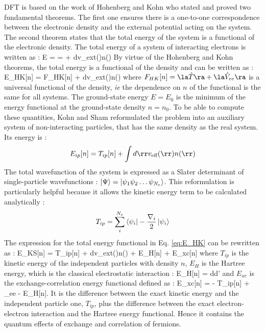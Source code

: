 \acrshort{DFT} is based on the work of Hohenberg and Kohn who stated and proved two fundamental theorems. \cite{hohenberg1964} The first one ensures there is a one-to-one correspondence between the electronic density and the external potential acting on the system. The second theorem states that the total energy of the system is a functional of the electronic density.
The total energy of a system of interacting electrons is written as :
\be
	E =  =  + \int d\rr v_{ext}(\rr)n(\rr)
\ee
By virtue of the Hohenberg and Kohn theorems, the total energy is a functional of the density and can be written as :
\be
 	E_{HK}[n] = F_{HK}[n] + \int d\rr v_{ext}(\rr)n(\rr)
	\label{eq:E_HK}
\ee
where $F_{HK}[n] = \la \hat{T} \ra + \la \hat{V}_{ee} \ra$ is a universal functional of the density, \emph{ie} the dependence on $n$ of the functional is the same for all systems. The ground-state energy $E = E_0$ is the minimum of the energy functional at the ground-state density $n=n_0$. To be able to compute these quantities, Kohn and Sham reformulated the problem into an auxiliary system of non-interacting particles, that has the same density as the real system.\cite{kohn1965} Its energy is :
\begin{equation}
	E_{ip}[n] = T_{ip}[n] + \int d\rr v_{\text{eff}}(\rr)n(\rr)
\end{equation}	
The total wavefunction of the system is expressed as a Slater determinant of single-particle wavefunctions : $\ket{\Psi} =\ket{\psi_1\psi_2 \ldots \psi_{N_e}}$. This reformulation is particularly helpful because it allows the kinetic energy term to be calculated analytically :
\begin{equation}
	T_{ip} =  \sum_i^{N_e} \bra{\psi_i}-\frac{\nabla_i}{2} \ket{\psi_i}
\end{equation}
The expression for the total energy functional in Eq. \eqref{eq:E_HK} can be rewritten as :
\be
	E_{KS}[n] = T_{ip}[n] + \int d\rr v_{ext}(\rr)n(\rr) + E_H[n] + E_{xc}[n]
\ee
where $T_{ip}$ is the kinetic energy of the independent particles with density $n$, $E_H$ is the Hartree energy, which is the classical electrostatic interaction :
\be
	E_H[n] = \int d\rr d\rr' 
	\label{eq:E_Hartree}
\ee
and $E_{xc}$ is the exchange-correlation energy functional defined as :
\be
	E_{xc}[n] = \langle {} \rangle - T_{ip}[n] + \langle {}_{ee} \rangle - E_H[n].
\ee
It is the difference between the exact kinetic energy and the independent particle one, $T_{ip}$, plus the difference between the exact electron-electron interaction and the Hartree energy functional. Hence it contains the quantum effects of exchange and correlation of fermions.

